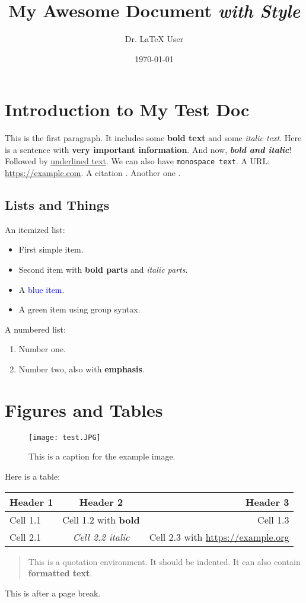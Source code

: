 \documentclass[a4paper,12pt]{article}
\title{My Awesome Document \textit{with Style}}
\author{Dr. LaTeX User}
\date{\today}
\newcommand{\important}[1]{\textbf{\textcolor{mycustomred}{#1}}}
\newcommand{\docname}{My Test Doc}
\begin{document}
\section{Introduction to \docname}
This is the first paragraph. It includes some \textbf{bold text} and some \textit{italic text}.
Here is a sentence with \important{very important information}.
And now, \textbf{\textit{bold and italic}}! Followed by \underline{underlined text}.
We can also have \texttt{monospace text}. A URL: \url{https://example.com}.
A citation \citep{cox_fish_2023, cox_fish_2023a}. Another one \citep{cox_fish_2023a}.

\subsection{Lists and Things}
An itemized list:
\begin{itemize}
    \item First simple item.
    \item Second item with \textbf{bold parts} and \textit{italic parts}.
    \item A \textcolor{Blue}{blue item}.
    \item {\color{Green}A green item using group syntax}.
\end{itemize}
A numbered list:
\begin{enumerate}
    \item Number one.
    \item Number two, also with \important{emphasis}.
\end{enumerate}

\section{Figures and Tables}
\begin{figure}[h!]
    \centering
    \texttt{[image: test.JPG]}
    \caption{This is a caption for the example image.}
    \label{fig:example}
\end{figure}

Here is a table:
\begin{tabular}{|l|c|r|}
\hline
Header 1 & Header 2 & Header 3 \\
\hline
Cell 1.1 & Cell 1.2 with \textbf{bold} & Cell 1.3 \\
Cell 2.1 & \textit{Cell 2.2 italic} & Cell 2.3 with \url{https://example.org} \\
\hline
\end{tabular}

\begin{quotation}
This is a quotation environment. It should be indented.
It can also contain \textbf{formatted text}.
\end{quotation}

\newpage
This is after a page break.

\printbibliography 
\end{document}
